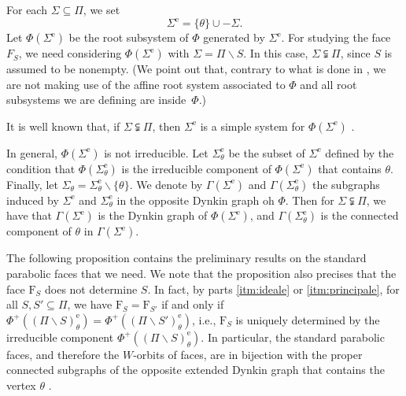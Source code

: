 \documentclass[10pt]{amsart}
\theoremstyle{definition}
\theoremstyle{remark}
\newcommand\smeno{\smallsetminus}
\newcommand\erm{{\mathrm{e}}}
\begin{document}
For each $\Sigma\subseteq\Pi$, we set
$$ \Sigma^\erm=\{\theta\}\cup  -\Sigma.$$ 
Let $\Phi(\Sigma^\erm)$ be the root subsystem of $\Phi$ generated by $\Sigma^\erm$. 
For studying the face $F_S$, we need considering $\Phi(\Sigma^\erm)$ with $\Sigma=\Pi\smeno S$. 
In this case, $\Sigma\subsetneqq\Pi$, since $S$ is assumed to be nonempty.
(We point out that, contrary to what is done in \cite{CM1}, we are not making use of the affine root system associated to $\Phi$ and all root subsystems we are defining are inside~$\Phi$.)

It is well known that, if $\Sigma\subsetneqq\Pi$, then $\Sigma^\erm$  is a simple system for $\Phi(\Sigma^\erm)$ \cite[\mbox{Ch.~II, \S~5}]{Dynk}.

\par



\par
In general, $\Phi(\Sigma^\erm)$ is not irreducible.
Let  ${\Sigma^\erm_\theta}$ be the subset of $\Sigma^\erm$ defined by the condition that $\Phi({\Sigma^\erm_\theta})$ is the irreducible component of $\Phi(\Sigma^\erm)$ that contains $\theta$.  
Finally, let $\Sigma_\theta={\Sigma^\erm_\theta}\smeno \{\theta\}$.
We denote by $\Gamma(\Sigma^\erm)$ and $\Gamma(\Sigma^\erm_\theta)$ the subgraphs induced by $\Sigma^\erm$ and $\Sigma^\erm_\theta$ in the opposite Dynkin graph oh $\Phi$.
Then for $\Sigma\subsetneqq \Pi$, we have that $\Gamma(\Sigma^\erm)$ is the Dynkin graph of $\Phi(\Sigma^\erm)$, and $\Gamma(\Sigma^\erm_\theta)$ is the connected component of $\theta$ in $\Gamma(\Sigma^\erm)$.
\par

The following proposition contains the preliminary results on the standard parabolic faces that we need. 
We note that the proposition also precises that the face $\mathrm F_S$ does not determine $S$. 
In fact, by parts \ref{itm:ideale} or \ref{itm:principale}, for all $S, S'\subseteq \Pi$, we have $\mathrm F_S=\mathrm F_{S'}$ if and only if  $\Phi^+((\Pi\smeno S)^\erm_\theta) = \Phi^+((\Pi\smeno S')^\erm_\theta)$, i.e., $\mathrm F_S$ is uniquely determined by the irreducible component $\Phi^+((\Pi\smeno S)^\erm_\theta)$.
In particular, the standard parabolic faces, and therefore the $W$-orbits of faces, are in bijection with the proper connected subgraphs of the opposite extended Dynkin graph that contains the vertex $\theta$ \cite{V}.
\end{document}
